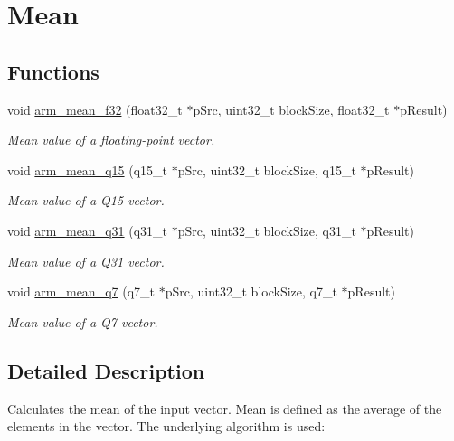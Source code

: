 \hypertarget{group__mean}{}\section{Mean}
\label{group__mean}
\subsection*{Functions}
\begin{DoxyCompactItemize}
\item 
void \hyperlink{group__mean_ga74ce08c49ab61e57bd50c3a0ca1fdb2b}{arm\+\_\+mean\+\_\+f32} (float32\+\_\+t $\ast$p\+Src, uint32\+\_\+t block\+Size, float32\+\_\+t $\ast$p\+Result)
\begin{DoxyCompactList}\small\item\em Mean value of a floating-\/point vector. \end{DoxyCompactList}\item 
void \hyperlink{group__mean_gac882495d5f098819fd3939c1ef7795b3}{arm\+\_\+mean\+\_\+q15} (q15\+\_\+t $\ast$p\+Src, uint32\+\_\+t block\+Size, q15\+\_\+t $\ast$p\+Result)
\begin{DoxyCompactList}\small\item\em Mean value of a Q15 vector. \end{DoxyCompactList}\item 
void \hyperlink{group__mean_gacf2526d8c2d75e486e8f0b0e31877ad0}{arm\+\_\+mean\+\_\+q31} (q31\+\_\+t $\ast$p\+Src, uint32\+\_\+t block\+Size, q31\+\_\+t $\ast$p\+Result)
\begin{DoxyCompactList}\small\item\em Mean value of a Q31 vector. \end{DoxyCompactList}\item 
void \hyperlink{group__mean_gaebc707ee539020357c25da4c75b52eb7}{arm\+\_\+mean\+\_\+q7} (q7\+\_\+t $\ast$p\+Src, uint32\+\_\+t block\+Size, q7\+\_\+t $\ast$p\+Result)
\begin{DoxyCompactList}\small\item\em Mean value of a Q7 vector. \end{DoxyCompactList}\end{DoxyCompactItemize}


\subsection{Detailed Description}
Calculates the mean of the input vector. Mean is defined as the average of the elements in the vector. The underlying algorithm is used\+:



